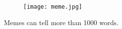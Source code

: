 \documentclass{article}
\begin{document}
\begin{figure}[h]
    \centering
    \texttt{[image: meme.jpg]}
\end{figure}

\begin{center}
    Memes can tell more than 1000 words.
\end{center}
\end{document}
